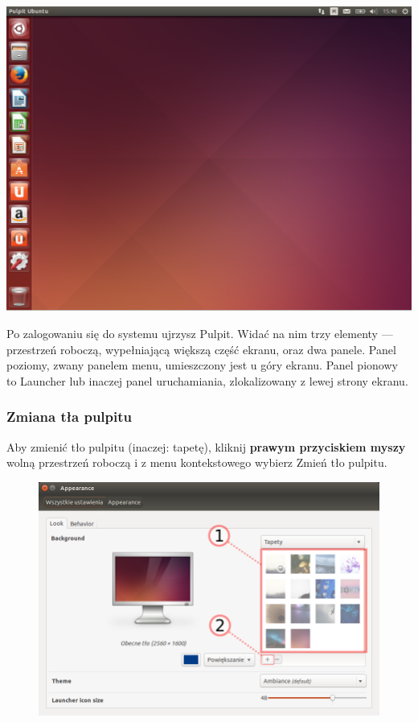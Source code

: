 \begin{center}
	\includegraphics[width=\linewidth]{images/unity_desktop.png}
\end{center}

Po zalogowaniu się do systemu ujrzysz Pulpit. Widać na nim trzy elementy --- przestrzeń roboczą, wypełniającą większą część ekranu, oraz dwa panele. Panel poziomy, zwany \textcolor{ubuntu_orange}{panelem menu}, umieszczony jest u góry ekranu. Panel pionowy to \textcolor{ubuntu_orange}{Launcher} lub inaczej panel uruchamiania, zlokalizowany z lewej strony ekranu.

\subsubsection{Zmiana tła pulpitu}
Aby zmienić tło pulpitu (inaczej: tapetę), kliknij \textbf{prawym przyciskiem myszy} wolną przestrzeń roboczą i z menu kontekstowego wybierz \textcolor{ubuntu_orange}{Zmień tło pulpitu}.

\begin{figure}
	\vspace{-10pt}
	\includegraphics[width=\linewidth]{images/unity_zmiana_tapety.png}
\end{figure}


